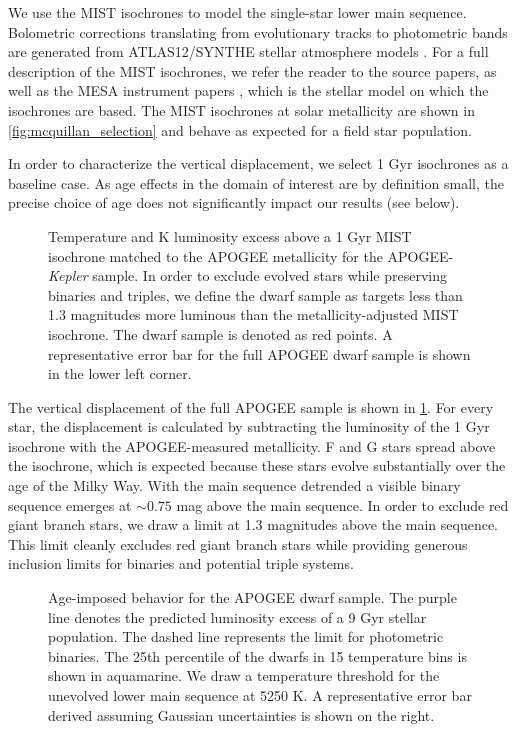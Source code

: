 \documentclass[manuscript]{aastex6}
\newcommand{\Kepler}{\mbox{\textit{Kepler}}}
\begin{document}
We use the MIST \citep{Dotter16,Choi16} isochrones to model the 
single-star lower main sequence. Bolometric corrections translating from
evolutionary tracks to photometric bands are generated from ATLAS12/SYNTHE
stellar atmosphere models \citep{Kurucz70,Kurucz93}. For a full description of the MIST isochrones, we 
refer the reader to the source papers, as well as the MESA instrument papers 
\citep{Paxton11, Paxton13, Paxton15}, which is the stellar model on which the 
isochrones are based. The MIST isochrones at solar metallicity are shown in 
\cref{fig:mcquillan_selection} and behave as expected for a field star 
population.

In order to characterize the vertical displacement, we select 1 Gyr isochrones
as a baseline case. As age effects in the domain of interest are by definition
small, the precise choice of age does not significantly impact our results (see
below).

\begin{figure}[htb]
    \centering
    \caption{Temperature and K luminosity excess above a 1 Gyr MIST isochrone 
        matched to the APOGEE metallicity for the APOGEE-\Kepler{} sample. 
        In order to exclude evolved stars while preserving binaries and
        triples, we define the dwarf sample as targets less than 1.3 magnitudes
        more luminous than the metallicity-adjusted MIST isochrone. The dwarf 
        sample is denoted as red points. A representative error bar for the 
        full APOGEE dwarf sample is shown in the lower left 
    corner.}\label{fig:sample_dk}
\end{figure}


The vertical displacement of the full APOGEE sample is shown in 
\cref{fig:sample_dk}. For every star, the displacement is calculated by
subtracting the luminosity of the 1 Gyr isochrone with the APOGEE-measured 
metallicity. F and G stars spread above the isochrone, which is 
expected because these stars evolve substantially over the age of the Milky
Way. With the main sequence detrended a visible binary sequence emerges at 
\(\sim0.75\) mag above the main sequence. In order to exclude red 
giant branch stars, we draw a limit at 1.3 magnitudes above the main sequence. 
This limit cleanly excludes red giant branch stars while providing generous 
inclusion limits for binaries and potential triple systems.

\begin{figure}[htb]
    \centering
    \caption{Age-imposed behavior for the APOGEE dwarf sample. The purple
        line denotes the predicted luminosity excess of a 9 Gyr stellar 
        population. The dashed line represents the limit for photometric
        binaries. The 25th percentile of the dwarfs in 15 temperature bins is
        shown in aquamarine. We draw a temperature threshold for the unevolved
        lower main sequence at 5250 K. A representative error bar
derived assuming Gaussian uncertainties is shown on the right.}
    \label{fig:ages}
\end{figure}
\end{document}
